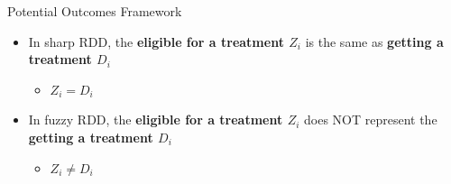 \documentclass[hyperref={pdfpagelabels=false}]{beamer}
\begin{document}
\begin{frame}{Potential Outcomes Framework}
	\begin{itemize}
		
		\item In sharp RDD, the \textbf{eligible for a treatment $Z_{i}$} is the same as \textbf{getting a treatment $D_{i}$} 
		\vspace{0.2cm}
		\begin{itemize}
			\item $Z_{i}=D_{i}$
		\end{itemize}
		
		\vspace{0.2cm}
		\item In fuzzy RDD, the \textbf{eligible for a treatment $Z_{i}$} does NOT represent the \textbf{getting a treatment $D_{i}$} 
		
		\vspace{0.2cm}
		\begin{itemize}
			\item $Z_{i}\neq D_{i}$
		\end{itemize}
		
		
		
		
		
	\end{itemize}
\end{frame}



%		
\end{document}
